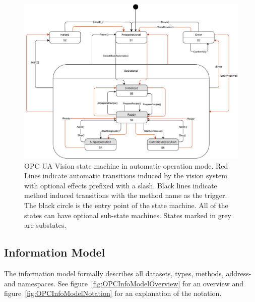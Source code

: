 \begin{figure}[ht]
    \centering
    \includegraphics[width=\textwidth]{img/OPCUAVisionVisionAutomaticModeStateMachineStates.pdf}
    \caption[OPC UA Vision state machine in automatic operation mode]{OPC UA Vision state machine in automatic operation mode. Red Lines indicate automatic transitions induced by the vision system with optional effects prefixed with a slash. Black lines indicate method induced transitions with the method name as the trigger. The black circle is the entry point of the state machine. All of the states can have optional sub-state machines. States marked in grey are substates.~\cite{VDMA2018OPCSpecification}}
    \label{fig:OPCStateMachineAutomatic}
\end{figure}

\subsection{Information Model}
The information model formally describes all datasets, types, methods, address- and namespaces. See figure~\ref{fig:OPCInfoModelOverview} for an overview and figure~\ref{fig:OPCInfoModelNotation} for an explanation of the notation. 

